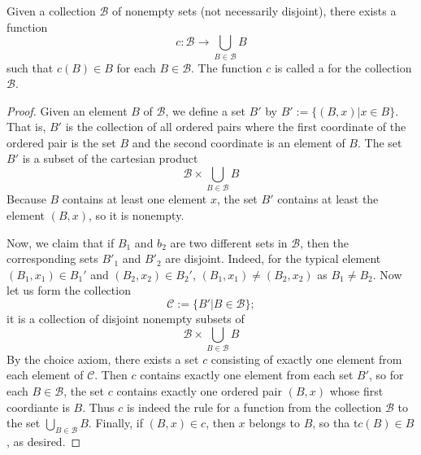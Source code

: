     \begin{lemma}
        Given a collection $\mathscr{B}$ of nonempty sets (not necessarily disjoint), there exists a function \begin{equation}
            c:\mathscr{B}\rightarrow \bigcup\limits_{B\in\mathscr{B}}B
        \end{equation}
        such that $c(B) \in B$ for each $B \in \mathscr{B}$. The function $c$ is called a  for the collection $\mathscr{B}$.
    \end{lemma}
    \begin{proof}
        Given an element $B$ of $\mathscr{B}$, we define a set $B'$ by $B' :=\{(B,x)\vert x \in B\}$. That is, $B'$ is the collection of all ordered pairs where the first coordinate of the ordered pair is the set $B$ and the second coordinate is an element of $B$. The set $B'$ is a subset of the cartesian product \begin{equation*}
            \mathscr{B}\times \bigcup\limits_{B\in \mathscr{B}}B
        \end{equation*}
        Because $B$ contains at least one element $x$, the set $B'$ contains at least the element $(B,x)$, so it is nonempty.

        Now, we claim that if $B_1$ and $b_2$ are two different sets in $\mathscr{B}$, then the corresponding sets $B'_1$ and $B'_2$ are disjoint. Indeed, for the typical element $(B_1,x_1) \in B_1'$ and $(B_2,x_2) \in B_2'$, $(B_1,x_1) \neq (B_2,x_2)$ as $B_1 \neq B_2$. Now let us form the collection \begin{equation*}
            \mathscr{C} :=\{B'\vert B \in \mathscr{B}\};
        \end{equation*}
        it is a collection of disjoint nonempty subsets of \begin{equation*}
            \mathscr{B}\times \bigcup\limits_{B\in \mathscr{B}}B
        \end{equation*}
        By the choice axiom, there exists a set $c$ consisting of exactly one element from each element of $\mathscr{C}$. Then $c$ contains exactly one element from each set $B'$, so for each $B \in \mathscr{B}$, the set $c$ contains exactly one ordered pair $(B,x)$ whose first coordiante is $B$. Thus $c$ is indeed the rule for a function from the collection $\mathscr{B}$ to the set $\bigcup_{B\in\mathscr{B}}B$. Finally, if $(B,x) \in c$, then $x$ belongs to $B$, so tha t$c(B) \in B$, as desired.
    \end{proof}




